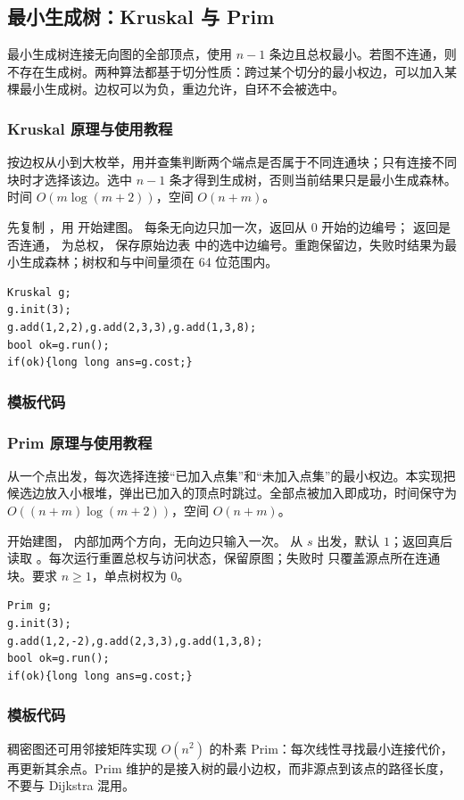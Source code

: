\subsection{最小生成树：Kruskal 与 Prim}
\label{algo:mst}
最小生成树连接无向图的全部顶点，使用 $n-1$ 条边且总权最小。若图不连通，则不存在生成树。两种算法都基于切分性质：跨过某个切分的最小权边，可以加入某棵最小生成树。边权可以为负，重边允许，自环不会被选中。

\subsubsection*{Kruskal 原理与使用教程}
按边权从小到大枚举，用并查集判断两个端点是否属于不同连通块；只有连接不同块时才选择该边。选中 $n-1$ 条才得到生成树，否则当前结果只是最小生成森林。时间 $O(m\log(m+2))$，空间 $O(n+m)$。

先复制 ，用  开始建图。 每条无向边只加一次，返回从 0 开始的边编号； 返回是否连通， 为总权， 保存原始边表  中的选中边编号。重跑保留边，失败时结果为最小生成森林；树权和与中间量须在 64 位范围内。
\begin{lstlisting}[style=mtycpp,numbers=none]
Kruskal g;
g.init(3);
g.add(1,2,2),g.add(2,3,3),g.add(1,3,8);
bool ok=g.run();
if(ok){long long ans=g.cost;}
\end{lstlisting}

\subsubsection*{模板代码}

\subsubsection*{Prim 原理与使用教程}
从一个点出发，每次选择连接“已加入点集”和“未加入点集”的最小权边。本实现把候选边放入小根堆，弹出已加入的顶点时跳过。全部点被加入即成功，时间保守为 $O((n+m)\log(m+2))$，空间 $O(n+m)$。

 开始建图， 内部加两个方向，无向边只输入一次。 从 $s$ 出发，默认 $1$；返回真后读取 。每次运行重置总权与访问状态，保留原图；失败时  只覆盖源点所在连通块。要求 $n\ge1$，单点树权为 0。
\begin{lstlisting}[style=mtycpp,numbers=none]
Prim g;
g.init(3);
g.add(1,2,-2),g.add(2,3,3),g.add(1,3,8);
bool ok=g.run();
if(ok){long long ans=g.cost;}
\end{lstlisting}

\subsubsection*{模板代码}

稠密图还可用邻接矩阵实现 $O(n^2)$ 的朴素 Prim：每次线性寻找最小连接代价，再更新其余点。Prim 维护的是接入树的最小边权，而非源点到该点的路径长度，不要与 Dijkstra 混用。
